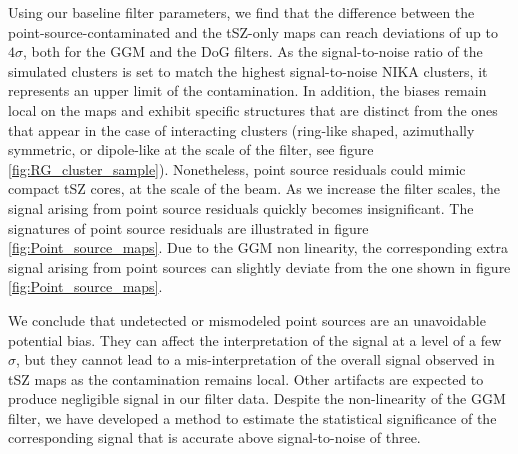 \documentclass[twocolumn,traditabstract]{aa}
\begin{document}
Using our baseline filter parameters, we find that the difference between the point-source-contaminated and the tSZ-only maps can reach deviations of up to $4 \sigma$, both for the GGM and the DoG filters. As the signal-to-noise ratio of the simulated clusters is set to match the highest signal-to-noise NIKA clusters, it represents an upper limit of the contamination. In addition, the biases remain local on the maps and exhibit specific structures that are distinct from the ones that appear in the case of interacting clusters (ring-like shaped, azimuthally symmetric, or dipole-like at the scale of the filter, see figure \ref{fig:RG_cluster_sample}). Nonetheless, point source residuals could mimic compact tSZ cores, at the scale of the beam. As we increase the filter scales, the signal arising from point source residuals quickly becomes insignificant. The signatures of point source residuals are illustrated in figure \ref{fig:Point_source_maps}. Due to the GGM non linearity, the corresponding extra signal arising from point sources can slightly deviate from the one shown in figure \ref{fig:Point_source_maps}.

We conclude that undetected or mismodeled point sources are an unavoidable potential bias. They can affect the interpretation of the signal at a level of a few $\sigma$, but they cannot lead to a mis-interpretation of the overall signal observed in tSZ maps as the contamination remains local. Other artifacts are expected to produce negligible signal in our filter data. Despite the non-linearity of the GGM filter, we have developed a method to estimate the statistical significance of the corresponding signal that is accurate above signal-to-noise of three.

\end{document}
